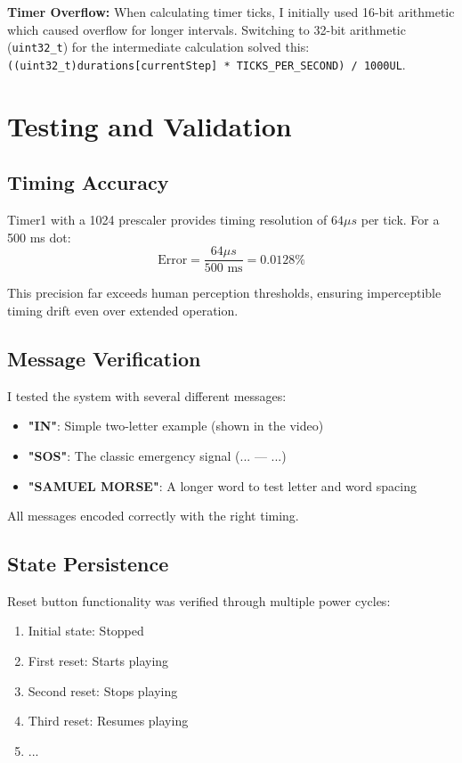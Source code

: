 \documentclass[report]{IEEEtran}
\begin{document}
\textbf{Timer Overflow:}
When calculating timer ticks, I initially used 16-bit arithmetic which caused overflow for longer intervals. Switching to 32-bit arithmetic (\texttt{uint32\_t}) for the intermediate calculation solved this: \texttt{((uint32\_t)durations[currentStep] * TICKS\_PER\_SECOND) / 1000UL}.

\section{Testing and Validation}

\subsection{Timing Accuracy}
Timer1 with a 1024 prescaler provides timing resolution of $64\mu s$ per tick. For a 500 ms dot:
$$\text{Error} = \frac{64\mu s}{500\text{ ms}} = 0.0128\%$$

This precision far exceeds human perception thresholds, ensuring imperceptible timing drift even over extended operation.

\subsection{Message Verification}
I tested the system with several different messages:
\begin{itemize}
    \item \textbf{"IN"}: Simple two-letter example (shown in the video)
    \item \textbf{"SOS"}: The classic emergency signal (... --- ...)
    \item \textbf{"SAMUEL MORSE"}: A longer word to test letter and word spacing
\end{itemize}

All messages encoded correctly with the right timing.

\subsection{State Persistence}
Reset button functionality was verified through multiple power cycles:
\begin{enumerate}
    \item Initial state: Stopped
    \item First reset: Starts playing
    \item Second reset: Stops playing
    \item Third reset: Resumes playing
    \item ...
\end{enumerate}
\end{document}
